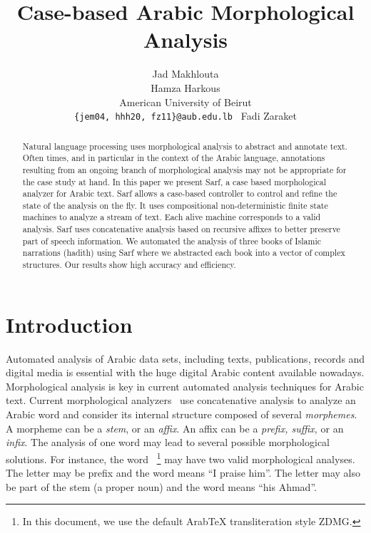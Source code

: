 \documentclass[11pt,letterpaper]{article}
\title{Case-based Arabic Morphological Analysis }
\author{ Jad Makhlouta \\
  \And
Hamza Harkous \\
  American University of Beirut \\
  {\tt \{jem04, hhh20, fz11\}@aub.edu.lb }
  \And 
  Fadi Zaraket 
}
\date{}
\begin{document}
\maketitle

\begin{abstract}
Natural language processing uses morphological 
analysis to abstract and annotate text.
Often times, and in particular in the context
of the Arabic language, annotations resulting from 
an ongoing branch of morphological analysis may not be
appropriate for the case study at hand. 
In this paper we present Sarf, a case based morphological 
analyzer for Arabic text. 
Sarf allows a case-based controller to control and refine
the state of the analysis on the fly. 
It uses compositional non-deterministic finite state machines 
to analyze a stream of text. 
Each alive machine corresponds to a valid analysis. 
Sarf uses concatenative analysis based on recursive affixes 
to better preserve part of speech information.
We automated the analysis of three books of Islamic
narrations (hadith) using Sarf where we
abstracted each book into a vector of complex structures.
Our results show high accuracy and efficiency.
\end{abstract}

\section{Introduction}

Automated analysis of Arabic data sets, including texts, 
publications, records and digital media is essential
with the huge digital Arabic content available nowadays. 
Morphological analysis is key in current automated 
analysis techniques for Arabic text. 
Current morphological analyzers~\cite{Sughaiyer:04}
use concatenative analysis
to analyze an Arabic word and
consider its internal structure composed of several
{\em morphemes}. A morpheme can be a {\em stem}, or an {\em affix}.
An affix can be a {\em prefix, suffix, } or an {\em infix}.
The analysis of one word may lead to several possible
morphological solutions.
\vocalize
For instance, the word ~\footnote{In this document, we use the default ArabTeX transliteration style ZDMG.}
may have two valid morphological analyses. 
The letter  may be prefix and the word means ``I praise him''.
The letter  may also be part of the stem 
 (a proper noun)
and the word means ``his Ahmad''.
\end{document}
